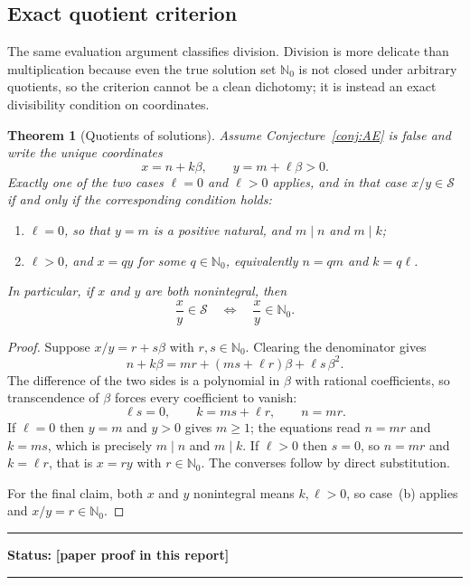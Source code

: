 \documentclass[11pt,oneside]{article}
\newtheorem{theorem}{Theorem}[section]
\theoremstyle{definition}
\theoremstyle{remark}
\newcommand{\Nzero}{\mathbb N_0}
\newcommand{\Sol}{\mathcal S}
\newcommand{\statusnew}{\textcolor{newgreen}{\textbf{[paper proof in this report]}}}
\newenvironment{statusbox}[1]
{\begin{center}\begin{minipage}{0.94\textwidth}\raggedright\hbadness=10000\hrule
\vspace{0.45em}\textbf{Status:} #1\par\vspace{0.35em}}
{\vspace{0.35em}\hrule\end{minipage}\end{center}}
\begin{document}
\subsection{Exact quotient criterion}

The same evaluation argument classifies division.  Division is more delicate than
multiplication because even the true solution set $\Nzero$ is not closed under arbitrary
quotients, so the criterion cannot be a clean dichotomy; it is instead an exact divisibility
condition on coordinates.

\begin{theorem}[Quotients of solutions]
\label{rr:thm-quotient}
Assume Conjecture~\ref{conj:AE} is false and write the unique coordinates
\[
 x=n+k\beta,
 \qquad
 y=m+\ell\beta>0 .
\]
Exactly one of the two cases $\ell=0$ and $\ell>0$ applies, and in that case
$x/y\in\Sol$ if and only if the corresponding condition holds:
\begin{enumerate}[label=\textup{(\alph*)}]
\item $\ell=0$, so that $y=m$ is a positive natural, and $m\mid n$ and $m\mid k$;
\item $\ell>0$, and $x=qy$ for some $q\in\Nzero$, equivalently $n=qm$ and $k=q\ell$.
\end{enumerate}
In particular, if $x$ and $y$ are both nonintegral, then
\[
 \frac{x}{y}\in\Sol
 \quad\Longleftrightarrow\quad
 \frac{x}{y}\in\Nzero .
\]
\end{theorem}

\begin{proof}
Suppose $x/y=r+s\beta$ with $r,s\in\Nzero$.  Clearing the denominator gives
\[
 n+k\beta
 =mr+(ms+\ell r)\beta+\ell s\,\beta^2 .
\]
The difference of the two sides is a polynomial in $\beta$ with rational coefficients, so
transcendence of $\beta$ forces every coefficient to vanish:
\[
 \ell s=0,
 \qquad
 k=ms+\ell r,
 \qquad
 n=mr .
\]
If $\ell=0$ then $y=m$ and $y>0$ gives $m\ge1$; the equations read $n=mr$ and $k=ms$, which
is precisely $m\mid n$ and $m\mid k$.  If $\ell>0$ then $s=0$, so $n=mr$ and $k=\ell r$, that
is $x=ry$ with $r\in\Nzero$.  The converses follow by direct substitution.

For the final claim, both $x$ and $y$ nonintegral means $k,\ell>0$, so case~(b) applies and
$x/y=r\in\Nzero$.
\end{proof}

\begin{statusbox}{\statusnew}
\end{statusbox}
\end{document}
